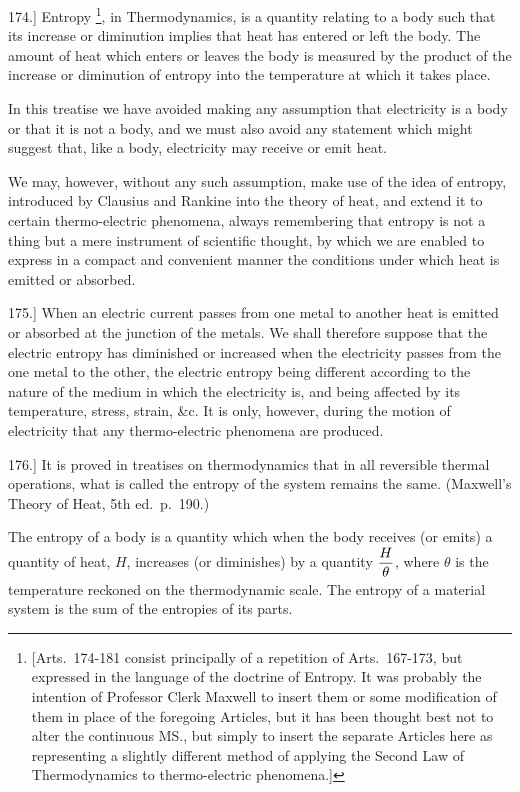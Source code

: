\documentclass[12pt,oneside]{book}[2021/10/04]
\let\oldfootnote\footnote
\renewcommand\footnote[1]{%
\oldfootnote{\hspace{0.14em}#1}}
\newcommand{\Runhead}[1]{\fancyhead[C]{\iffloatpage{}{\small#1}}}
\newcommand{\article}[1]{\phantomsection \label{art:#1}{#1.]}}
\newcommand{\xp}{\rule[-2.0ex]{0pt}{5.2ex}}
\newcommand{\¬}{\hphantom{0}}
\begin{document}
\article{174} Entropy\footnote{
[Arts.\ 174-181 consist principally of a repetition of Arts.\ 167-173, but expressed
in the language of the doctrine of Entropy. It was probably the intention of Professor
Clerk Maxwell to insert them or some modification of them in place of the
foregoing Articles, but it has been thought best not to alter the continuous MS., but
simply to insert the separate Articles here as representing a slightly different method
of applying the Second Law of Thermodynamics to thermo-electric phenomena.]}, in Thermodynamics, is a quantity relating to
a body such that its increase or diminution implies that heat has
entered or left the body. The amount of heat which enters or
leaves the body is measured by the product of the increase or
diminution of entropy into the temperature at which it takes
place.

In this treatise we have avoided making any assumption that
electricity is a body or that it is not a body, and we must also avoid
any statement which might suggest that, like a body, electricity
may receive or emit heat.

We may, however, without any such assumption, make use of
the idea of entropy, introduced by Clausius and Rankine into the
theory of heat, and extend it to certain thermo-electric phenomena,
always remembering that entropy is not a thing but a mere instrument
of scientific thought, by which we are enabled to express in a
compact and convenient manner the conditions under which heat
is emitted or absorbed.
\Runhead{ENTROPY.}

\article{175} When an electric current passes from one metal to another
heat is emitted or absorbed at the junction of the metals. We shall
therefore suppose that the electric entropy has diminished or increased
when the electricity passes from the one metal to the other,
the electric entropy being different according to the nature of the
medium in which the electricity is, and being affected by its
temperature, stress, strain, \&c. It is only, however, during the
motion of electricity that any thermo-electric phenomena are produced.

\article{176} It is proved in treatises on thermodynamics that in all reversible
thermal operations, what is called the entropy of the system
remains the same. (Maxwell's Theory of Heat, 5th ed.\ p.\ 190.)

The entropy of a body is a quantity which when the body receives
(or emits) a quantity of heat, \(H\), increases (or diminishes) by
a quantity \(\xp\dfrac{H}{\theta}\), where \(\theta\) is the temperature reckoned on the thermodynamic
scale. The entropy of a material system is the sum of
the entropies of its parts.
\Runhead{ELECTRIC ENTROPY.}
\end{document}
